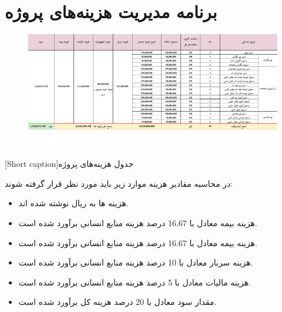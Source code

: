 \section{
برنامه مدیریت هزینه‌های پروژه
}

\begin{center}
  \begin{figure} [h!]
    { \includegraphics[width=\textwidth , scale=1.5]{appandecies/costs.pdf}}
  \end{figure}
  [Short caption]{جدول هزینه‌های پروژه}
\end{center}

در محاسبه مقادیر هزینه موارد زیر باید مورد نظر قرار گرفته شوند:
\begin{itemize}
	\item{
	هزینه ها به ریال نوشته شده اند.	
	}
	\item{
	هزینه بیمه معادل با 16.67 درصد هزینه منابع انسانی برآورد شده است.	
	}
	\item{
	هزینه بیمه معادل با 16.67 درصد هزینه منابع انسانی برآورد شده است.	
	}
	\item {
	هزینه سربار معادل با 10 درصد هزینه منابع انسانی برآورد شده است.	
	}
	\item{
	هزینه مالیات معادل با 5 درصد هزینه منابع انسانی برآورد شده است.	
	}
	\item{
	مقدار سود معادل با 20 درصد هزینه کل برآورد شده است.	
	}
\end{itemize}
